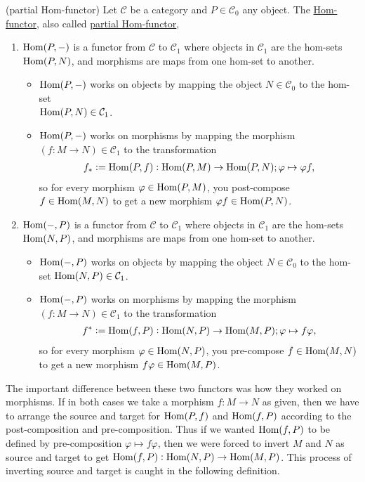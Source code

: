 \begin{example}{(partial Hom-functor)}\label{ex:hom_functor}
Let $\mathcal{C}$ be a category and $P \in \mathcal{C}_{0}$ any object. The \ul{Hom-functor}, also called \ul{partial Hom-functor},
\begin{enumerate}
\renewcommand{\labelenumi}{(\theenumi)}
\item $\textup{Hom}(P,-)$ is a functor from $\mathcal{C}$ to $\mathcal{C}_{1}$ where objects in $\mathcal{C}_{1}$ are the hom-sets 
$\textup{Hom}(P,N)$, and morphisms are maps from one hom-set to another.
\begin{itemize}
\item $\textup{Hom}(P,-)$ works on objects by mapping the object $N \in \mathcal{C}_{0}$ to
the hom-set\\
$\textup{Hom}(P,N) \in \mathcal{C}_{1}$.
\item $\textup{Hom}(P,-)$ works on morphisms by mapping the morphism $(f : M \rightarrow N ) \in \mathcal{C}_{1}$ to the transformation
\begin{align}
f_{*} := \textup{Hom}(P,f) : \textup{Hom}(P,M) \rightarrow \textup{Hom}(P,N); \varphi \mapsto \varphi f,
\end{align}
so for every morphism $\varphi \in \textup{Hom}(P,M)$, you post-compose $f \in \textup{Hom}(M,N)$ to get a new
morphism $\varphi f \in \textup{Hom}(P,N)$.
\end{itemize}

\item $\textup{Hom}(-,P)$ is a functor from $\mathcal{C}$ to $\mathcal{C}_{1}$ where objects in $\mathcal{C}_{1}$ are the hom-sets 
$\textup{Hom}(N,P)$, and morphisms are maps from one hom-set to another.
\begin{itemize}
\item $\textup{Hom}(-,P)$ works on objects by mapping the object $N \in \mathcal{C}_{0}$ to
the hom-set $\textup{Hom}(N,P) \in \mathcal{C}_{1}$.
\item $\textup{Hom}(-,P)$ works on morphisms by mapping the morphism $(f : M \rightarrow N ) \in \mathcal{C}_{1}$ to the transformation
\begin{align}
f^{*} := \textup{Hom}(f,P) : \textup{Hom}(N,P) \rightarrow \textup{Hom}(M,P); \varphi \mapsto f\varphi,
\end{align}
so for every morphism $\varphi \in \textup{Hom}(N,P)$, you pre-compose $f \in \textup{Hom}(M,N)$ to get a new
morphism $f\varphi \in \textup{Hom}(M,P)$.
\end{itemize}
\end{enumerate}

The important difference between these two functors was how they worked on morphisms. If in both cases we take a morphism
$f : M \rightarrow N$ as given, then we have to arrange the source and target for $\textup{Hom}(P,f)$ and $\textup{Hom}(f,P)$
according to the post-composition and pre-composition. Thus if we wanted $\textup{Hom}(f,P)$ to be defined by pre-composition
$\varphi \mapsto f\varphi$, then we were forced to invert $M$ and $N$ as source and target to get 
$\textup{Hom}(f,P): \textup{Hom}(N,P) \rightarrow \textup{Hom}(M,P)$. 
This process of inverting source and target is caught in the following definition.
\end{example}

